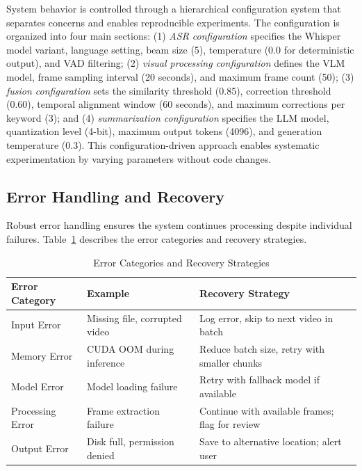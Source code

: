 System behavior is controlled through a hierarchical configuration system that separates concerns and enables reproducible experiments. The configuration is organized into four main sections: (1) \textit{ASR configuration} specifies the Whisper model variant, language setting, beam size (5), temperature (0.0 for deterministic output), and VAD filtering; (2) \textit{visual processing configuration} defines the VLM model, frame sampling interval (20 seconds), and maximum frame count (50); (3) \textit{fusion configuration} sets the similarity threshold (0.85), correction threshold (0.60), temporal alignment window (60 seconds), and maximum corrections per keyword (3); and (4) \textit{summarization configuration} specifies the LLM model, quantization level (4-bit), maximum output tokens (4096), and generation temperature (0.3). This configuration-driven approach enables systematic experimentation by varying parameters without code changes.

\subsection{Error Handling and Recovery}

Robust error handling ensures the system continues processing despite individual failures. Table~\ref{tab:error_handling} describes the error categories and recovery strategies.

\begin{table}[h]
\centering
\caption{Error Categories and Recovery Strategies}
\label{tab:error_handling}
\begin{tabular}{|l|p{4cm}|p{5.5cm}|}
\hline
\textbf{Error Category} & \textbf{Example} & \textbf{Recovery Strategy} \\
\hline
Input Error & Missing file, corrupted video & Log error, skip to next video in batch \\
\hline
Memory Error & CUDA OOM during inference & Reduce batch size, retry with smaller chunks \\
\hline
Model Error & Model loading failure & Retry with fallback model if available \\
\hline
Processing Error & Frame extraction failure & Continue with available frames; flag for review \\
\hline
Output Error & Disk full, permission denied & Save to alternative location; alert user \\
\hline
\end{tabular}
\end{table}


